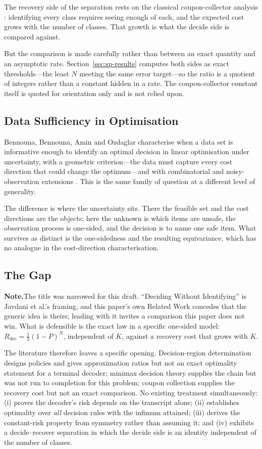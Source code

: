 \documentclass[conference]{IEEEtran}
\theoremstyle{definition}
\newif\ifshownotes\shownotestrue
\newcommand{\NOTEPAR}[1]{\ifshownotes\par\vspace{2pt}\noindent%
  {\color{notecol}\textsf{\footnotesize\textbf{Note.}\;#1}}\par\vspace{2pt}\fi}
\begin{document}
The recovery side of the separation rests on the classical coupon-collector analysis
\cite{motwani1995}: identifying every class requires seeing enough of each, and the expected
cost grows with the number of classes. That growth is what the decide side is compared
against.

But the comparison is made carefully rather than between an exact quantity and an asymptotic
rate. Section~\ref{sec:sp-results} computes both sides as exact thresholds---the least $N$
meeting the same error target---so the ratio is a quotient of integers rather than a constant
hidden in a rate. The coupon-collector constant itself is quoted for orientation only and is
not relied upon.

\subsection{Data Sufficiency in Optimisation}

Bennouna, Bennouna, Amin and Ozdaglar characterise when a data set is informative enough to
identify an optimal decision in linear optimisation under uncertainty, with a geometric
criterion---the data must capture every cost direction that could change the optimum---and
with combinatorial and noisy-observation extensions \cite{bennouna2026}. This is the same
family of question at a different level of generality.

The difference is where the uncertainty sits. There the feasible set and the cost directions
are the objects; here the unknown is which items are unsafe, the observation process is
one-sided, and the decision is to name one safe item. What survives as distinct is the
one-sidedness and the resulting equivariance, which has no analogue in the cost-direction
characterisation.

\subsection{The Gap}
\NOTEPAR{The title was narrowed for this draft. ``Deciding Without Identifying'' is
Javdani et al.'s framing, and this paper's own Related Work concedes that the generic idea is
theirs; leading with it invites a comparison this paper does not win. What is defensible is
the exact law in a specific one-sided model: $R_{\mathrm{dec}}=\tfrac12(1-P)^{N}$,
independent of $K$, against a recovery cost that grows with $K$.}

The literature therefore leaves a specific opening. Decision-region determination designs
policies and gives approximation ratios but not an exact optimality statement for a terminal
decoder; minimax decision theory supplies the chain but was not run to completion for this
problem; coupon collection supplies the recovery cost but not an exact comparison. No existing
treatment simultaneously: (i) proves the decoder's risk depends on the transcript alone;
(ii) establishes optimality over \emph{all} decision rules with the infimum attained;
(iii) derives the constant-risk property from symmetry rather than assuming it; and
(iv) exhibits a decide--recover separation in which the decide side is an identity independent
of the number of classes.
\end{document}
